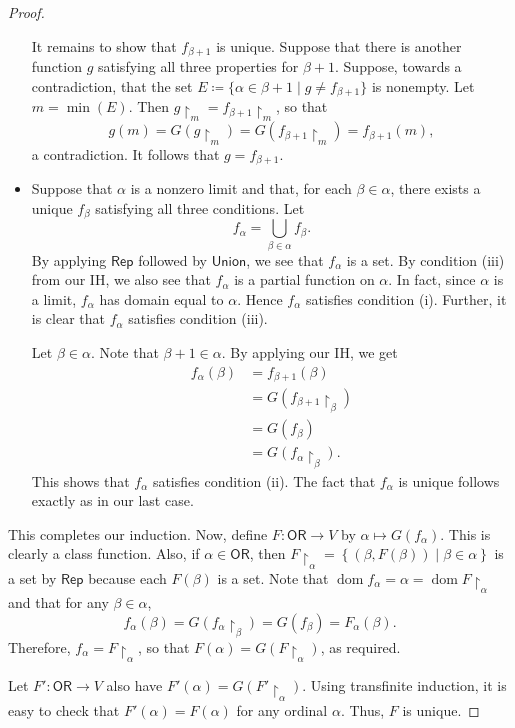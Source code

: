 \documentclass[10pt,letterpaper,cm]{nupset}
\theoremstyle{definition}
\theoremstyle{theorem}
\theoremstyle{remark}
\newcommand{\1}{\mathbf{1}}
\newcommand{\0}{\vec 0}
\newcommand{\ord}{\mathsf{OR}}
\DeclareMathOperator{\dom}{dom}
\begin{document}
\begin{proof}
\begin{itemize}
 It remains to show that $f_{\beta +1}$ is unique. Suppose that there is another function $g$ satisfying all three properties for $\beta +1$. Suppose, towards a contradiction, that the set $E\coloneqq \{\alpha  \in \beta +1 \mid g \ne f_{\beta +1}\}$ is nonempty. Let $m = \min(E)$. Then $g\restriction_m = f_{\beta +1}\restriction_m $, so that $$g(m) = G(g\restriction_m)  = G(f_{\beta +1}\restriction_m) = f_{\beta +1}(m),$$ a contradiction. It follows that $g = f_{\beta +1}$.
\item Suppose that $\alpha$ is a nonzero limit and that, for each $\beta \in \alpha$, there exists a unique $f_{\beta}$ satisfying all three conditions. Let $$f_{\alpha} =\bigcup_{\beta \in \alpha} f_{\beta}.$$ By applying $\mathsf{Rep}$ followed by $\mathsf{Union}$, we see that $f_{\alpha}$ is a set. By condition (iii) from our IH, we also see that $f_{\alpha}$ is a partial function on $\alpha$. In fact, since $\alpha$ is a limit, $f_{\alpha}$ has domain equal to $\alpha$. Hence $f_{\alpha}$ satisfies condition (i). Further, it is clear that $f_{\alpha}$ satisfies condition (iii). 

Let $\beta \in \alpha$. Note that $\beta +1 \in \alpha$. By applying our IH, we get
\begin{align*}
f_{\alpha}(\beta) & = f_{\beta +1}(\beta)  
\\ &  = G(f_{\beta +1}\restriction_{\beta}) 
\\ & = G(f_{\beta})  
\\ & = G(f_{\alpha}\restriction_{\beta}).
\end{align*}
This shows that $f_{\alpha}$ satisfies condition (ii). The fact that $f_{\alpha}$ is unique follows exactly as in our last case.
\end{itemize}$ $This completes our induction. Now, define $F: \ord \to V$ by $\alpha \mapsto G(f_{\alpha})$. This is clearly a class function. Also, if $\alpha \in \ord$, then $F\restriction_{\alpha} = \left\{(\beta, F(\beta)) \mid \beta \in \alpha\right\}$ is a set by $\mathsf{Rep}$ because  each $F(\beta)$ is a set. Note that $\dom{f_{\alpha}} = \alpha = \dom{F\restriction_{\alpha}}$ and that for any $\beta \in \alpha$,
$$  f_{\alpha}(\beta) = G(f_{\alpha}\restriction_{\beta}) =  G(f_{\beta})= F_{\alpha}(\beta)  .$$ Therefore, $f_{\alpha} = F\restriction_{\alpha}$, so that $F(\alpha) = G(F\restriction_{\alpha})$, as required. 

\smallskip

Let $F' : \ord \to V$ also have $F'(\alpha) = G(F'\restriction_{\alpha})$. Using transfinite induction, it is easy to check that $F'(\alpha) = F(\alpha)$ for any ordinal $\alpha$. Thus, $F$ is unique. 
\end{proof}
\end{document}

